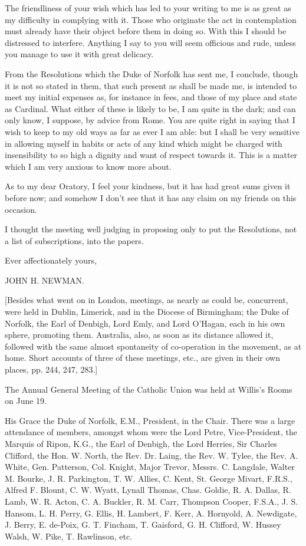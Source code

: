 The friendliness of your wish which has led to your writing to me is
as great as my difficulty in complying with it. Those who originate
the act in contemplation must already have their object before them in
doing so. With this I should be distressed to interfere. Anything I
say to you will seem officious and rude, unless you manage to use it
with great delicacy.

From the Resolutions which the Duke of Norfolk has sent me, I
conclude, though it is not so stated in them, that such present as
shall be made me, is intended to meet my initial expenses as, for
instance in fees, and those of my place and state as Cardinal. What
either of these is likely to be, I am quite in the dark; and can only
know, I suppose, by advice from Rome. You are quite right in saying
that I wish to keep to my old ways as far as ever I am able: but I
shall be very sensitive in allowing myself in habits or acts of any
kind which might be charged with insensibility to so high a dignity
and want of respect towards it. This is a matter which I am very
anxious to know more about.

As to my dear Oratory, I feel your kindness, but it has had great
sums given it before now; and somehow I don't see that it has any
claim on my friends on this occasion.

I thought the meeting well judging in proposing only to put the
Resolutions, not a list of subscriptions, into the papers.

Ever affectionately yours,

JOHN H. NEWMAN.

[Besides what went on in London, meetings, as nearly as could be,
concurrent, were held in Dublin, Limerick, and in the Diocese of
Birmingham; the Duke of Norfolk, the Earl of Denbigh, Lord Emly, and
Lord O'Hagan, each in his own sphere, promoting them. Australia, also,
as soon as its distance allowed it, followed with the same almost
spontaneity of co-operation in the movement, as at home. Short
accounts of three of these meetings, etc., are given in their own
places, pp. 244, 247, 283.]


The Annual General Meeting of the Catholic Union was held at Willis's
Rooms on June 19.

His Grace the Duke of Norfolk, E.M., President, in the Chair. There
was a large attendance of members, amongst whom were the Lord Petre,
Vice-President, the Marquis of Ripon, K.G., the Earl of Denbigh, the
Lord Herries, Sir Charles Clifford, the Hon. W. North, the Rev. Dr.
Laing, the Rev. W. Tylee, the Rev. A. White, Gen. Patterson, Col.
Knight, Major Trevor, Messrs. C. Langdale, Walter M. Bourke, J. R.
Parkington, T. W. Allies, C. Kent, St. George Mivart, F.R.S., Alfred
F. Blount, C. W. Wyatt, Lynall Thomas, Chas. Goldie, R. A. Dallas, R.
Lamb, W. R. Acton, C. A. Buckler, R. M. Carr, Thompson Cooper, F.S.A.,
J. S. Hansom, L. H. Perry, G. Ellis, H. Lambert, F. Kerr, A. Hornyold,
A. Newdigate, J. Berry, E. de-Poix, G. T. Fincham, T. Gaisford, G. H.
Clifford, W. Hussey Walsh, W. Pike, T. Rawlinson, etc.

